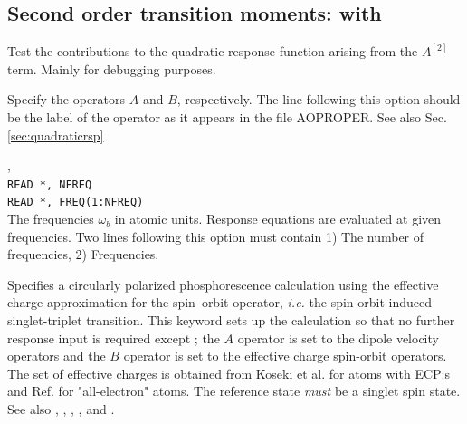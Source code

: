 \subsection{Second order transition moments:  with }


\begin{description}

\item{}
Test the contributions to the quadratic response function arising from
the $A^{\left[2\right]}$ term. Mainly for debugging purposes.

\item[\Key{APROP}, \Key{BPROP}]
Specify the operators $A$ and $B$, respectively. The line following this
option should be the label of the operator as it appears in the file
AOPROPER. See also Sec.\ref{sec:quadraticrsp}

\item{, }\\
\verb|READ *, NFREQ|\\
\verb|READ *, FREQ(1:NFREQ)|\\
The frequencies $\omega_b$ in atomic units.
Response equations are evaluated at given
frequencies. Two lines
following this option must contain 1) The number of frequencies, 2)
Frequencies.

\item{}
Specifies a circularly polarized phosphorescence 
calculation using the effective charge approximation for the spin--orbit operator, {\it i.e.\/}
the spin-orbit
induced singlet-triplet transition. This keyword sets up the
calculation so that no further response input is required except ; the
$A$ operator is set to the dipole velocity operators and
the $B$ operator is set to the effective charge spin-orbit
operators. The set of effective charges is obtained from Koseki et al.
\cite{skmsgmwsnm99,skmwsmsgjpca102} for atoms with ECP:s and Ref.\cite{skmwsmsgjpc96} for "all-electron" atoms.
The reference state {\em must} be a singlet spin state. See  also , , 
, , and .


\end{description}
